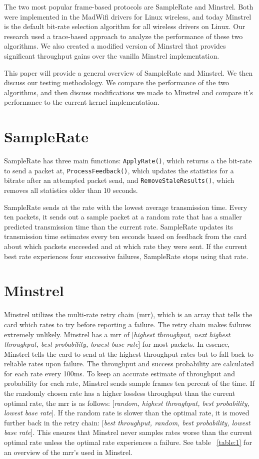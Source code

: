 \documentclass[letterpaper,twocolumn,10pt]{article}
\begin{document}
The two most popular frame-based protocols are SampleRate and
Minstrel. Both were implemented in the MadWifi drivers for Linux
wireless, and today Minstrel is the default bit-rate selection
algorithm for all wireless drivers on Linux. Our research used a
trace-based approach to analyze the performance of these two
algorithms. We also created a modified version of Minstrel that
provides significant throughput gains over the vanilla Minstrel
implementation.

This paper will provide a general overview of SampleRate and
Minstrel. We then discuss our testing methodology. We compare the
performance of the two algorithms, and then discuss modifications we
made to Minstrel and compare it's performance to the current kernel
implementation.


\section{SampleRate}

SampleRate has three main functions: \texttt{ApplyRate()}, which
returns a the bit-rate to send a packet at,
\texttt{ProcessFeedback()}, which updates the statistics for a bitrate
after an attempted packet send, and \texttt{RemoveStaleResults()},
which removes all statistics older than 10 seconds.

SampleRate sends at the rate with the lowest average transmission
time. Every ten packets, it sends out a sample packet at a random rate
that has a smaller predicted transmission time than the current
rate. SampleRate updates its transmission time estimates every ten
seconds based on feedback from the card about which packets succeeded
and at which rate they were sent. If the current best rate experiences
four successive failures, SampleRate stops using that rate.


\section{Minstrel}

Minstrel utilizes the multi-rate retry chain (mrr), which is an array
that tells the card which rates to try before reporting a failure. The
retry chain makes failures extremely unlikely. Minstrel has a mrr of
[\emph{highest throughput, next highest throughput, best probability,
    lowest base rate}] for most packets. In essence, Minstrel tells
the card to send at the highest throughput rates but to fall back to
reliable rates upon failure. The throughput and success probability
are calculated for each rate every 100ms.  To keep an accurate
estimate of throughput and probability for each rate, Minstrel sends
sample frames ten percent of the time. If the randomly chosen rate has
a higher lossless throughput than the current optimal rate, the mrr is
as follows: [\emph{random, highest throughput, best probability,
    lowest base rate}]. If the random rate is slower than the optimal
rate, it is moved further back in the retry chain: [\emph{best
    throughput, random, best probability, lowest base rate}]. This
ensures that Minstrel never samples rates worse than the current
optimal rate unless the optimal rate experiences a failure. See table
~\ref{table:1} for an overview of the mrr's used in Minstrel.
\end{document}
